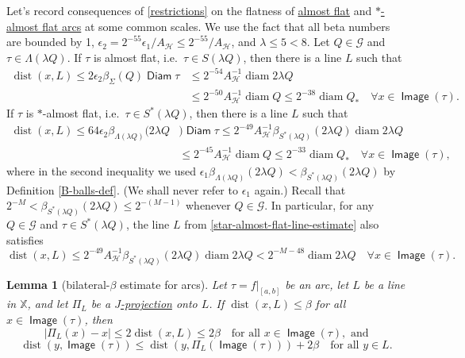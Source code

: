 \documentclass[12pt]{amsart}
\numberwithin{equation}{section}
\theoremstyle{plain}
\newtheorem{lemma}[theorem]{Lemma}
\theoremstyle{definition}
\def\XX{{\mathbb{X}}}
\newcommand{\diam}{\mathop\mathrm{diam}\nolimits}
\newcommand{\dist}{\mathop\mathrm{dist}\nolimits}
\newcommand{\Image}{\mathop\mathsf{Image}\nolimits}
\newcommand{\Diam}{\mathop\mathsf{Diam}\nolimits}
\numberwithin{figure}{section}
\begin{document}
Let's record consequences of \eqref{restrictions} on the flatness of \hyperref[def:arcs]{almost flat} and \hyperref[def:arcs]{$*$-almost flat arcs} at some common scales. We use the fact that all beta numbers are bounded by 1, $\epsilon_2=2^{-55}\epsilon_1/A_\mathscr{H}\leq 2^{-55}/A_\mathscr{H}$, and $\lambda\leq 5<8$. Let $Q\in\mathscr{G}$ and $\tau\in\Lambda(\lambda Q)$. If $\tau$ is almost flat, i.e.~$\tau\in S(\lambda Q)$, then there is a line $L$ such that
   \begin{equation}\begin{split}\label{almost-flat-line-estimate} \dist(x,L) \leq 2\epsilon_2\beta_{\Sigma}(Q) \Diam \tau &\leq 2^{-54}A_\mathscr{H}^{-1}\diam 2\lambda Q \\
   & \leq 2^{-50}A_\mathscr{H}^{-1} \diam Q \leq 2^{-38}\diam Q_*\quad \forall x\in\Image(\tau).\end{split}\end{equation}
If $\tau$ is $*$-almost flat, i.e.~$\tau\in S^*(\lambda Q)$, then there is a line $L$ such that
    \begin{equation}\begin{split}\label{star-almost-flat-line-estimate} \dist(x,L) \leq 64\epsilon_2\beta_{\Lambda(\lambda Q)}(2\lambda Q&) \Diam \tau \leq 2^{-49}A_\mathscr{H}^{-1} \beta_{S^*(\lambda Q)}(2\lambda Q)\diam 2\lambda Q\\ &\leq 2^{-45} A_\mathscr{H}^{-1}\diam Q \leq 2^{-33}\diam Q_*\quad \forall x\in\Image(\tau),\end{split}\end{equation} where in the second inequality we used $\epsilon_1 \beta_{\Lambda(\lambda Q)}(2\lambda Q)<\beta_{S^*(\lambda Q)}(2\lambda Q)$ by Definition \ref{B-balls-def}. (We shall never refer to $\epsilon_1$ again.) Recall that $2^{-M}<\beta_{S^*(\lambda Q)}(2\lambda Q)\leq 2^{-(M-1)}$ whenever $Q\in\mathscr{G}$.
In particular, for any $Q\in\mathscr{G}$ and $\tau\in S^*(\lambda Q)$, the line $L$ from \eqref{star-almost-flat-line-estimate} also satisfies \begin{equation}\label{line-estimate-with-M}
\dist(x,L)\leq 2^{-49}A_\mathscr{H}^{-1}\beta_{S^*(\lambda Q)}(2\lambda Q) \diam 2\lambda Q < 2^{-M-48} \diam 2\lambda Q\quad \forall  x\in\Image(\tau).\end{equation}

\begin{lemma}[bilateral-$\beta$ estimate for arcs] \label{l:bilateral} Let $\tau=f|_{[a,b]}$ be an arc, let $L$ be a line in $\XX$, and let $\Pi_L$ be a \hyperref[def:J-proj]{$J$-projection} onto $L$. If $\dist(x,L)\leq \beta$ for all $x\in\Image(\tau)$, then \begin{equation}\label{Pi-x} |\Pi_L(x)-x|\leq 2\dist(x,L)\leq 2\beta\quad\text{for all }x\in\Image(\tau),\text{ and}\end{equation}
\begin{equation}\label{bilateral} \dist(y,\Image(\tau))\leq \dist(y,\Pi_L(\Image(\tau)))+2\beta\quad\text{for all }y\in L.\end{equation}
\end{lemma}
\end{document}
